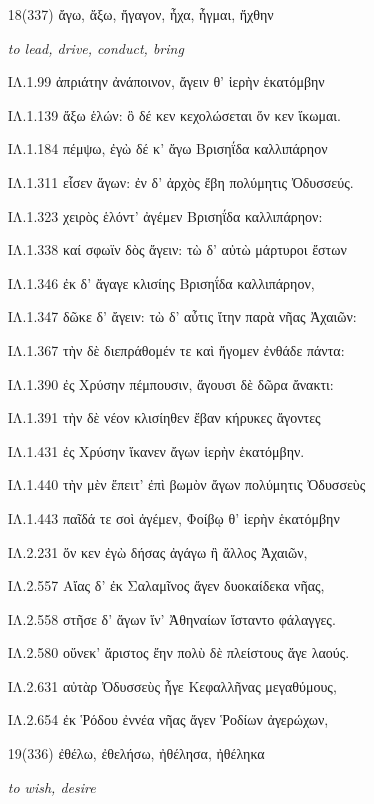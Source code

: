 \begin{enumerate}
{}

\clearpage
\item[\large 18(337)]{\large \g ἄγω, ἄξω, ἤγαγον, ἦχα, ἦγμαι, ἤχθην}

\hspace{0.2cm} \textit{to lead, drive, conduct, bring }

{\g
ΙΛ.1.99 ἀπριάτην ἀνάποινον, ἄγειν θ' ἱερὴν ἑκατόμβην

ΙΛ.1.139 ἄξω ἑλών: ὃ δέ κεν κεχολώσεται ὅν κεν ἵκωμαι.

ΙΛ.1.184 πέμψω, ἐγὼ δέ κ' ἄγω Βρισηΐδα καλλιπάρηον

ΙΛ.1.311 εἷσεν ἄγων: ἐν δ' ἀρχὸς ἔβη πολύμητις Ὀδυσσεύς.

ΙΛ.1.323 χειρὸς ἑλόντ' ἀγέμεν Βρισηΐδα καλλιπάρηον:

ΙΛ.1.338 καί σφωϊν δὸς ἄγειν: τὼ δ' αὐτὼ μάρτυροι ἔστων

ΙΛ.1.346 ἐκ δ' ἄγαγε κλισίης Βρισηΐδα καλλιπάρηον,

ΙΛ.1.347 δῶκε δ' ἄγειν: τὼ δ' αὖτις ἴτην παρὰ νῆας Ἀχαιῶν:

ΙΛ.1.367 τὴν δὲ διεπράθομέν τε καὶ ἤγομεν ἐνθάδε πάντα:

ΙΛ.1.390 ἐς Χρύσην πέμπουσιν, ἄγουσι δὲ δῶρα ἄνακτι:

ΙΛ.1.391 τὴν δὲ νέον κλισίηθεν ἔβαν κήρυκες ἄγοντες

ΙΛ.1.431 ἐς Χρύσην ἵκανεν ἄγων ἱερὴν ἑκατόμβην.

ΙΛ.1.440 τὴν μὲν ἔπειτ' ἐπὶ βωμὸν ἄγων πολύμητις Ὀδυσσεὺς

ΙΛ.1.443 παῖδά τε σοὶ ἀγέμεν, Φοίβῳ θ' ἱερὴν ἑκατόμβην

ΙΛ.2.231 ὅν κεν ἐγὼ δήσας ἀγάγω ἢ ἄλλος Ἀχαιῶν,

ΙΛ.2.557 Αἴας δ' ἐκ Σαλαμῖνος ἄγεν δυοκαίδεκα νῆας,

ΙΛ.2.558 στῆσε δ' ἄγων ἵν' Ἀθηναίων ἵσταντο φάλαγγες.

ΙΛ.2.580 οὕνεκ' ἄριστος ἔην πολὺ δὲ πλείστους ἄγε λαούς.

ΙΛ.2.631 αὐτὰρ Ὀδυσσεὺς ἦγε Κεφαλλῆνας μεγαθύμους,

ΙΛ.2.654 ἐκ Ῥόδου ἐννέα νῆας ἄγεν Ῥοδίων ἀγερώχων,

}

\clearpage
\item[\large 19(336)]{\large \g  ἐθέλω, ἐθελήσω, ἠθέλησα, ἠθέληκα }

\hspace{0.2cm} \textit{to wish, desire   }


\end{enumerate}
